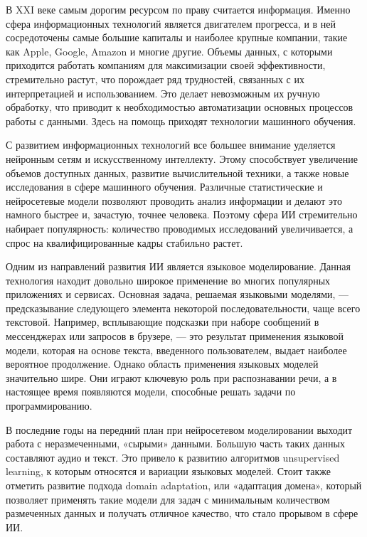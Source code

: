 \label{sec:intro}

В XXI веке самым дорогим ресурсом по праву считается информация. Именно сфера информационных технологий является двигателем прогресса, и в ней сосредоточены самые большие капиталы и наиболее крупные компании, такие как Apple, Google, Amazon и многие другие. Объемы данных, с которыми приходится работать компаниям для максимизации своей эффективности, стремительно растут, что порождает ряд трудностей, связанных с их интерпретацией и использованием. Это делает невозможным их ручную обработку, что приводит к необходимостью автоматизации основных процессов работы с данными. Здесь на помощь приходят технологии машинного обучения.

С развитием информационных технологий все большее внимание уделяется нейронным сетям и искусственному интеллекту. Этому способствует увеличение объемов доступных данных, развитие вычислительной техники, а также новые исследования в сфере машинного обучения. Различные статистические и нейросетевые модели позволяют проводить анализ информации и делают это намного быстрее и, зачастую, точнее человека. Поэтому сфера ИИ стремительно набирает популярность: количество проводимых исследований увеличивается, а спрос на квалифицированные кадры стабильно растет.

Одним из направлений развития ИИ является языковое моделирование. Данная технология находит довольно широкое применение во многих популярных приложениях и сервисах. Основная задача, решаемая языковыми моделями, --- предсказывание следующего элемента некоторой последовательности, чаще всего текстовой. Например, всплывающие подсказки при наборе сообщений в мессенджерах или запросов в брузере, --- это результат применения языковой модели, которая на основе текста, введенного пользователем, выдает наиболее вероятное продолжение. Однако область применения языковых моделей значительно шире. Они играют ключевую роль при распознавании речи, а в настоящее время появляются модели, способные решать задачи по программированию. 

В последние годы на передний план при нейросетевом моделировании выходит работа с неразмеченными, «сырыми» данными. Большую часть таких данных составляют аудио и текст. Это привело к развитию алгоритмов unsupervised learning, к которым относятся и вариации языковых моделей. Стоит также отметить развитие подхода domain adaptation, или «адаптация домена», который позволяет применять такие модели для задач с минимальным количеством размеченных данных и получать отличное качество, что стало прорывом в сфере ИИ.

